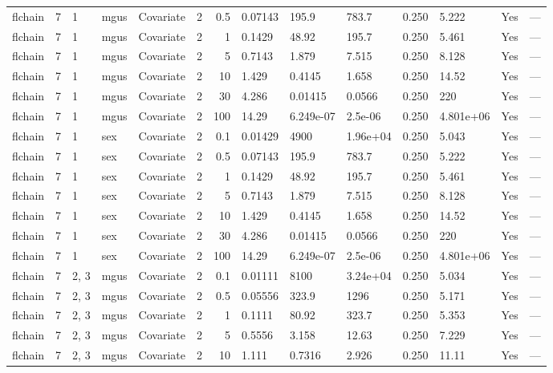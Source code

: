 \begin{tabular}{lrlllrrlllllll}
  flchain & 7 & 1 & mgus & Covariate & 2 &   0.5 & 0.07143 & 195.9 & 783.7 & 0.250 & 5.222 & Yes & --- \\ 
  flchain & 7 & 1 & mgus & Covariate & 2 &     1 & 0.1429 & 48.92 & 195.7 & 0.250 & 5.461 & Yes & --- \\ 
  flchain & 7 & 1 & mgus & Covariate & 2 &     5 & 0.7143 & 1.879 & 7.515 & 0.250 & 8.128 & Yes & --- \\ 
  flchain & 7 & 1 & mgus & Covariate & 2 &    10 & 1.429 & 0.4145 & 1.658 & 0.250 & 14.52 & Yes & --- \\ 
  flchain & 7 & 1 & mgus & Covariate & 2 &    30 & 4.286 & 0.01415 & 0.0566 & 0.250 & 220 & Yes & --- \\ 
  flchain & 7 & 1 & mgus & Covariate & 2 &   100 & 14.29 & 6.249e-07 & 2.5e-06 & 0.250 & 4.801e+06 & Yes & --- \\ 
  flchain & 7 & 1 & sex & Covariate & 2 &   0.1 & 0.01429 & 4900 & 1.96e+04 & 0.250 & 5.043 & Yes & --- \\ 
  flchain & 7 & 1 & sex & Covariate & 2 &   0.5 & 0.07143 & 195.9 & 783.7 & 0.250 & 5.222 & Yes & --- \\ 
  flchain & 7 & 1 & sex & Covariate & 2 &     1 & 0.1429 & 48.92 & 195.7 & 0.250 & 5.461 & Yes & --- \\ 
  flchain & 7 & 1 & sex & Covariate & 2 &     5 & 0.7143 & 1.879 & 7.515 & 0.250 & 8.128 & Yes & --- \\ 
  flchain & 7 & 1 & sex & Covariate & 2 &    10 & 1.429 & 0.4145 & 1.658 & 0.250 & 14.52 & Yes & --- \\ 
  flchain & 7 & 1 & sex & Covariate & 2 &    30 & 4.286 & 0.01415 & 0.0566 & 0.250 & 220 & Yes & --- \\ 
  flchain & 7 & 1 & sex & Covariate & 2 &   100 & 14.29 & 6.249e-07 & 2.5e-06 & 0.250 & 4.801e+06 & Yes & --- \\ 
  flchain & 7 & 2, 3 & mgus & Covariate & 2 &   0.1 & 0.01111 & 8100 & 3.24e+04 & 0.250 & 5.034 & Yes & --- \\ 
  flchain & 7 & 2, 3 & mgus & Covariate & 2 &   0.5 & 0.05556 & 323.9 & 1296 & 0.250 & 5.171 & Yes & --- \\ 
  flchain & 7 & 2, 3 & mgus & Covariate & 2 &     1 & 0.1111 & 80.92 & 323.7 & 0.250 & 5.353 & Yes & --- \\ 
  flchain & 7 & 2, 3 & mgus & Covariate & 2 &     5 & 0.5556 & 3.158 & 12.63 & 0.250 & 7.229 & Yes & --- \\ 
  flchain & 7 & 2, 3 & mgus & Covariate & 2 &    10 & 1.111 & 0.7316 & 2.926 & 0.250 & 11.11 & Yes & --- \\ 

\end{tabular}
